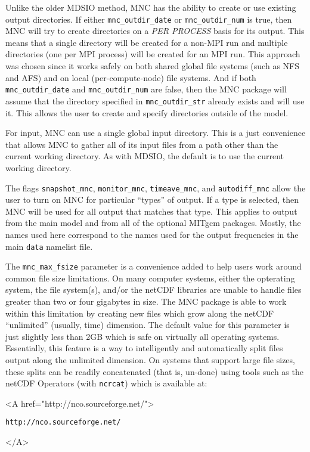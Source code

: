 Unlike the older MDSIO method, MNC has the ability to create or use
existing output directories.  If either \texttt{mnc\_outdir\_date} or
\texttt{mnc\_outdir\_num} is true, then MNC will try to create
directories on a \textit{PER PROCESS} basis for its output.  This
means that a single directory will be created for a non-MPI run and
multiple directories (one per MPI process) will be created for an MPI
run.  This approach was chosen since it works safely on both shared
global file systems (such as NFS and AFS) and on local
(per-compute-node) file systems.  And if both
\texttt{mnc\_outdir\_date} and \texttt{mnc\_outdir\_num} are false,
then the MNC package will assume that the directory specified in
\texttt{mnc\_outdir\_str} already exists and will use it.  This allows
the user to create and specify directories outside of the model.

For input, MNC can use a single global input directory.  This is a
just convenience that allows MNC to gather all of its input files from a
path other than the current working directory.  As with MDSIO, the
default is to use the current working directory.

The flags \texttt{snapshot\_mnc}, \texttt{monitor\_mnc},
\texttt{timeave\_mnc}, and \texttt{autodiff\_mnc} allow the user to
turn on MNC for particular ``types'' of output.  If a type is
selected, then MNC will be used for all output that matches that type.
This applies to output from the main model and from all of the
optional MITgcm packages.  Mostly, the names used here correspond to
the names used for the output frequencies in the main \texttt{data}
namelist file.

The \texttt{mnc\_max\_fsize} parameter is a convenience added to help
users work around common file size limitations.  On many computer
systems, either the opterating system, the file system(s), and/or the
netCDF libraries are unable to handle files greater than two or four
gigabytes in size.  The MNC package is able to work within this
limitation by creating new files which grow along the netCDF
``unlimited'' (usually, time) dimension.  The default value for this
parameter is just slightly less than 2GB which is safe on virtually
all operating systems.  Essentially, this feature is a way to
intelligently and automatically split files output along the unlimited
dimension.  On systems that support large file sizes, these splits can
be readily concatenated (that is, un-done) using tools such as the
netCDF Operators (with \texttt{ncrcat}) which is available at:
\begin{rawhtml} <A href="http://nco.sourceforge.net/"> \end{rawhtml}
\begin{verbatim}
http://nco.sourceforge.net/
\end{verbatim}
\begin{rawhtml} </A> \end{rawhtml}

